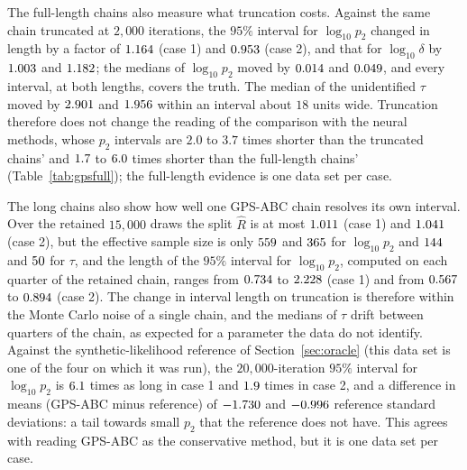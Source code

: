 \documentclass[sn-basic,iicol,pdflatex]{sn-jnl}
\begin{document}
The full-length chains also measure what truncation costs. Against the same chain truncated at $2{,}000$ iterations, the
$95\%$ interval for $\log_{10}p_2$ changed in length by a factor of $1.164$ (case 1) and $0.953$ (case 2), and that for
$\log_{10}\delta$ by $1.003$ and $1.182$; the medians of $\log_{10}p_2$ moved by $0.014$ and
$0.049$, and every interval, at both lengths, covers the truth. The median of the unidentified $\tau$ moved by $2.901$ and
$1.956$ within an interval about $18$ units wide. Truncation therefore does not change the reading of the comparison with the neural methods, whose $p_2$ intervals are $2.0$ to $3.7$
times shorter than the truncated chains' and $1.7$ to $6.0$ times shorter than the full-length chains' (Table~\ref{tab:gpsfull}); the full-length evidence is one data set per case.

The long chains also show how well one GPS-ABC chain resolves its own interval. Over the retained $15{,}000$ draws the split $\hat R$ is at most $1.011$ (case 1) and $1.041$ (case 2), but
the effective sample size is only $559$ and $365$ for $\log_{10}p_2$ and $144$ and $50$ for $\tau$, and the length of the $95\%$ interval for
$\log_{10}p_2$, computed on each quarter of the retained chain, ranges from $0.734$ to $2.228$ (case 1) and from $0.567$ to $0.894$ (case 2). The
change in interval length on truncation is therefore within the Monte Carlo noise of a single chain, and the medians of $\tau$ drift between quarters of the chain, as expected for a parameter the data do not identify.
Against the synthetic-likelihood reference of Section~\ref{sec:oracle} (this data set is one of the four on which it was run), the $20{,}000$-iteration $95\%$ interval for $\log_{10}p_2$ is $6.1$ times as long in case 1 and
$1.9$ times in case 2, and a difference in means (GPS-ABC minus reference) of $-1.730$ and $-0.996$ reference standard deviations: a tail towards small $p_2$ that the reference does not have. This agrees with reading GPS-ABC as the conservative method, but it is one data set per case.
\end{document}
